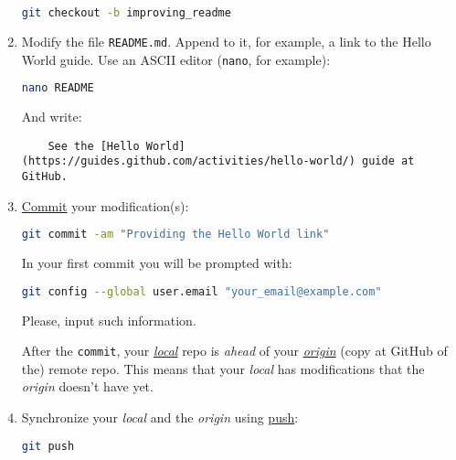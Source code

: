 \begin{enumerate}
  \begin{lstlisting}[language=bash]
    git checkout -b improving_readme
  \end{lstlisting}
  
\item Modify the file \texttt{README.md}. Append to it, for example, a
  link to the Hello World guide. Use an ASCII editor (\texttt{nano},
  for example):

  \begin{lstlisting}[language=bash]
    nano README
  \end{lstlisting}

  And write:
  
  \begin{lstlisting}
    See the [Hello World](https://guides.github.com/activities/hello-world/) guide at GitHub.
  \end{lstlisting}
  
\item
  \href{https://docs.github.com/en/github/getting-started-with-github/github-glossary#commit}{Commit}
  your modification(s):

  \begin{lstlisting}[language=bash, showstringspaces=false, upquote=true]
    git commit -am "Providing the Hello World link"
  \end{lstlisting}

  In your first commit you will be prompted with:

  \begin{lstlisting}[language=bash]
    git config --global user.email "your_email@example.com"
  \end{lstlisting}

  Please, input such information.
  
  After the \texttt{commit}, your \href{https://docs.github.com/en/github/getting-started-with-github/github-glossary#fetch}{\emph{local}} repo is \emph{ahead} of
  your
  \href{https://docs.github.com/en/github/getting-started-with-github/github-glossary#origin}{\emph{origin}}
  (copy at GitHub of the) remote repo. This means that your
  \emph{local} has modifications that the \emph{origin} doesn't have yet.

\item Synchronize your \emph{local} and the \emph{origin} using
  \href{https://docs.github.com/en/github/getting-started-with-github/github-glossary#push}{push}:

  \begin{lstlisting}[language=bash]
    git push
  \end{lstlisting}


\end{enumerate}

